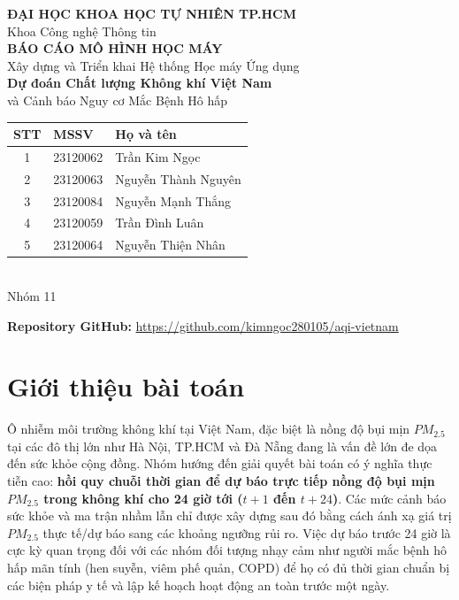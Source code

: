 \documentclass[12pt,a4paper]{article}
\begin{document}
\begin{titlepage}
    \centering
    \vspace*{1cm}
    {\Large \textbf{ĐẠI HỌC KHOA HỌC TỰ NHIÊN TP.HCM}}\\[0.3cm]
    {\large Khoa Công nghệ Thông tin}\\[2cm]

    {\Huge \textbf{BÁO CÁO MÔ HÌNH HỌC MÁY}}\\[0.5cm]
    {\large Xây dựng và Triển khai Hệ thống Học máy Ứng dụng}\\[2cm]

    {\LARGE \textbf{Dự đoán Chất lượng Không khí Việt Nam}}\\[0.3cm]
    {\large và Cảnh báo Nguy cơ Mắc Bệnh Hô hấp}\\[2cm]

    \begin{tabular}{cll}
        \toprule
        \textbf{STT} & \textbf{MSSV} & \textbf{Họ và tên} \\
        \midrule
        1 & 23120062 & Trần Kim Ngọc \\
        2 & 23120063 & Nguyễn Thành Nguyên \\
        3 & 23120084 & Nguyễn Mạnh Thắng \\
        4 & 23120059 & Trần Đình Luân \\
        5 & 23120064 & Nguyễn Thiện Nhân \\
        \bottomrule
    \end{tabular}\\[2cm]

    {\large Nhóm 11}
\end{titlepage}

\tableofcontents
\vspace{0.5cm}
\noindent\textbf{Repository GitHub:} \href{https://github.com/kimngoc280105/aqi-vietnam}{https://github.com/kimngoc280105/aqi-vietnam}
\newpage

\section{Giới thiệu bài toán}

Ô nhiễm môi trường không khí tại Việt Nam, đặc biệt là nồng độ bụi mịn $PM_{2.5}$ tại các đô thị lớn như Hà Nội, TP.HCM và Đà Nẵng đang là vấn đề lớn đe dọa đến sức khỏe cộng đồng. Nhóm hướng đến giải quyết bài toán có ý nghĩa thực tiễn cao: \textbf{hồi quy chuỗi thời gian để dự báo trực tiếp nồng độ bụi mịn $PM_{2.5}$ trong không khí cho 24 giờ tới ($t+1$ đến $t+24$)}. Các mức cảnh báo sức khỏe và ma trận nhầm lẫn chỉ được xây dựng sau đó bằng cách ánh xạ giá trị $PM_{2.5}$ thực tế/dự báo sang các khoảng ngưỡng rủi ro. Việc dự báo trước 24 giờ là cực kỳ quan trọng đối với các nhóm đối tượng nhạy cảm như người mắc bệnh hô hấp mãn tính (hen suyễn, viêm phế quản, COPD) để họ có đủ thời gian chuẩn bị các biện pháp y tế và lập kế hoạch hoạt động an toàn trước một ngày.
\end{document}
